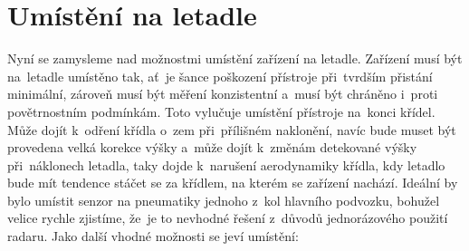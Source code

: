 	\section{Umístění na letadle}\label{navrhReseni::umisteniNaLetadle}
		Nyní se zamysleme nad možnostmi umístění zařízení na letadle. Zařízení musí být na~letadle umístěno tak, ať~je šance poškození přístroje při~tvrdším přistání minimální, zároveň musí být měření konzistentní a~musí být chráněno i~proti povětrnostním podmínkám. Toto vylučuje umístění přístroje na~konci křídel. Může dojít k~odření křídla o~zem při~přílišném naklonění, navíc bude muset být provedena velká korekce výšky a~může dojít k~změnám detekované výšky při~náklonech letadla, taky dojde k~narušení aerodynamiky křídla, kdy letadlo bude mít tendence stáčet se za křídlem, na kterém se zařízení nachází. Ideální by bylo umístit senzor na pneumatiky jednoho z~kol hlavního podvozku, bohužel velice rychle zjistíme, že~je to nevhodné řešení z~důvodů jednorázového použití radaru. Jako další vhodné možnosti se jeví umístění:
